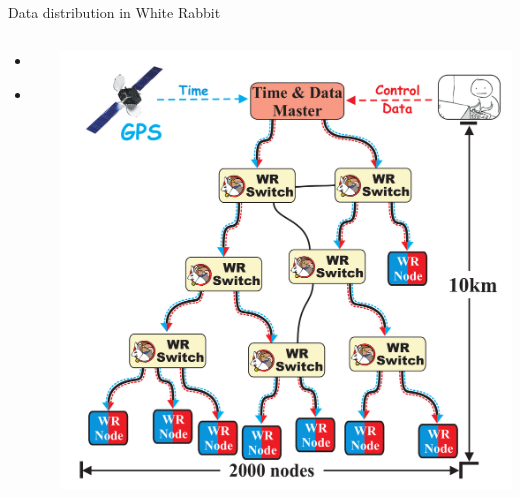 \documentclass[compress,red]{beamer}
\begin{document}
\subsection{}
\begin{frame}{Data distribution in White Rabbit}


\begin{columns}[c]
 
  \begin{itemize}
    \item \color{gray}{High accuracy/precision synchronization}
    \item \textbf{\color{red}{Deterministic, reliable and low-latency Control Data delivery}}
  \end{itemize}

    \begin{center}
    \includegraphics[height=1.0\textwidth]{network/wr_network-new.pdf}
    \end{center}
\end{columns}

\end{frame}
\end{document}
